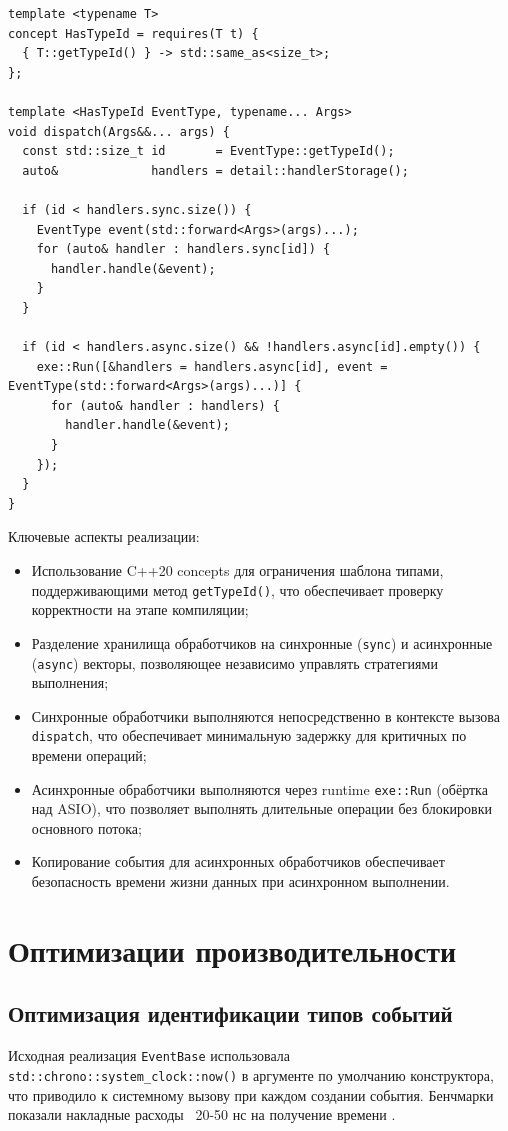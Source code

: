 \documentclass[12pt,a4paper]{report}
\begin{document}
\begin{lstlisting}[caption={Функция dispatch с разделением синхронных и асинхронных обработчиков},label=lst:dispatch]
template <typename T>
concept HasTypeId = requires(T t) {
  { T::getTypeId() } -> std::same_as<size_t>;
};

template <HasTypeId EventType, typename... Args>
void dispatch(Args&&... args) {
  const std::size_t id       = EventType::getTypeId();
  auto&             handlers = detail::handlerStorage();

  if (id < handlers.sync.size()) {
    EventType event(std::forward<Args>(args)...);
    for (auto& handler : handlers.sync[id]) {
      handler.handle(&event);
    }
  }

  if (id < handlers.async.size() && !handlers.async[id].empty()) {
    exe::Run([&handlers = handlers.async[id], event = EventType(std::forward<Args>(args)...)] {
      for (auto& handler : handlers) {
        handler.handle(&event);
      }
    });
  }
}
\end{lstlisting}

Ключевые аспекты реализации:
\begin{itemize}
    \item Использование C++20 concepts для ограничения шаблона типами, поддерживающими метод \texttt{getTypeId()}, что обеспечивает проверку корректности на этапе компиляции;
    \item Разделение хранилища обработчиков на синхронные (\texttt{sync}) и асинхронные (\texttt{async}) векторы, позволяющее независимо управлять стратегиями выполнения;
    \item Синхронные обработчики выполняются непосредственно в контексте вызова \texttt{dispatch}, что обеспечивает минимальную задержку для критичных по времени операций;
    \item Асинхронные обработчики выполняются через runtime \texttt{exe::Run} (обёртка над ASIO), что позволяет выполнять длительные операции без блокировки основного потока;
    \item Копирование события для асинхронных обработчиков обеспечивает безопасность времени жизни данных при асинхронном выполнении.
\end{itemize}

\section{Оптимизации производительности}
\subsection{Оптимизация идентификации типов событий}
Исходная реализация \texttt{EventBase} использовала \texttt{std::chrono::system\_clock::now()} в аргументе по умолчанию конструктора, что приводило к системному вызову при каждом создании события. Бенчмарки показали накладные расходы ~20-50 нс на получение времени \cite{drago2019clock}.
\end{document}

